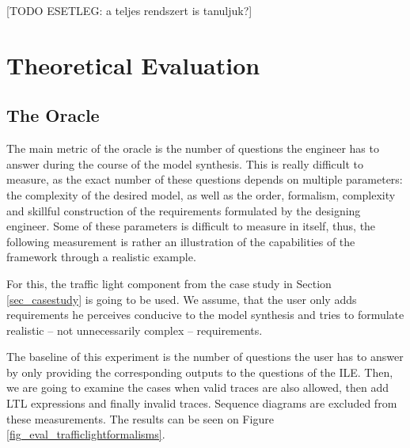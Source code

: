 [TODO ESETLEG: a teljes rendszert is tanuljuk?]

\clearpage
\section{Theoretical Evaluation} \label{sec_theoeval}

\subsection{The Oracle} \label{subs_evaloracle}
The main metric of the oracle is the number of questions the engineer has to answer during the course of the model synthesis. This is really difficult to measure, as the exact number of these questions depends on multiple parameters: the complexity of the desired model, as well as the order, formalism, complexity and skillful construction of the requirements formulated by the designing engineer. Some of these parameters is difficult to measure in itself, thus, the following measurement is rather an illustration of the capabilities of the framework through a realistic example. 

For this, the traffic light component from the case study in Section \ref{sec_casestudy} is going to be used. We assume, that the user only adds requirements he perceives conducive to the model synthesis and tries to formulate realistic -- not unnecessarily complex -- requirements. 

The baseline of this experiment is the number of questions the user has to answer by only providing the corresponding outputs to the questions of the ILE. Then, we are going to examine the cases when valid traces are also allowed, then add LTL expressions and finally invalid traces. Sequence diagrams are excluded from these measurements. The results can be seen on Figure \ref{fig_eval_trafficlightformalisms}.

